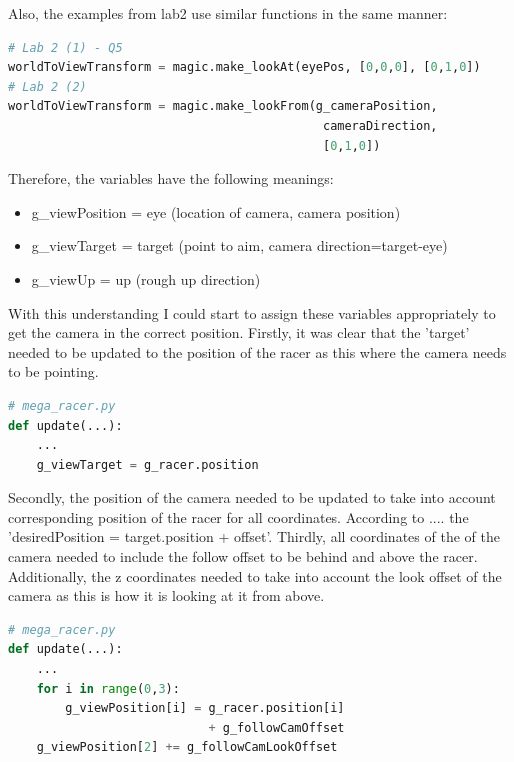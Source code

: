 \documentclass[a4 paper, 12pt]{article}
\begin{document}
Also, the examples from lab2 use similar functions in the same manner:
    \begin{lstlisting}[language=python]
# Lab 2 (1) - Q5
worldToViewTransform = magic.make_lookAt(eyePos, [0,0,0], [0,1,0])
# Lab 2 (2) 
worldToViewTransform = magic.make_lookFrom(g_cameraPosition,   
                                            cameraDirection, 
                                            [0,1,0])
    \end{lstlisting}
    
Therefore, the variables have the following meanings:
    \begin{itemize}
        \item g\_viewPosition = eye (location of camera, camera position)
        \item g\_viewTarget = target (point to aim, camera direction=target-eye)
        \item g\_viewUp = up (rough up direction)
    \end{itemize}    
    
With this understanding I could start to assign these variables appropriately to get the camera in the correct position. Firstly, it was clear that the 'target' needed to be updated to the position of the racer as this where the camera needs to be pointing. 
    \begin{lstlisting}[language=python]
# mega_racer.py
def update(...):
    ...
    g_viewTarget = g_racer.position
    \end{lstlisting}

Secondly, the position of the camera needed to be updated to take into account corresponding position of the racer for all coordinates. According to .... the 'desiredPosition = target.position + offset'. Thirdly, all coordinates of the of the camera needed to include the follow offset to be behind and above the racer. Additionally, the z coordinates needed to take into account the look offset of the camera as this is how it is looking at it from above.
    \begin{lstlisting}[language=python]
# mega_racer.py
def update(...):
    ...
    for i in range(0,3):
        g_viewPosition[i] = g_racer.position[i] 
                            + g_followCamOffset
    g_viewPosition[2] += g_followCamLookOffset
    \end{lstlisting}
\end{document}
